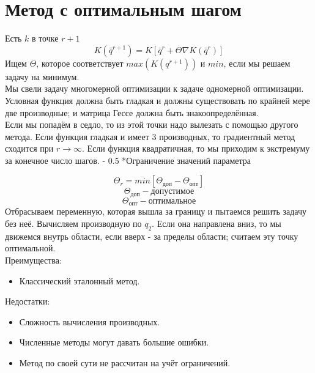 \documentclass[12pt,a5paper]{scrbook}
\makeatletter
\renewcommand\paragraph{\@startsection{paragraph}{4}{0mm}%
{-\baselineskip} %
{0.5\baselineskip} %
{\normalfont\bfseries}}%
\makeatother
\begin{document}
  \section{Метод с оптимальным шагом}
  Есть $k$ в точке $r+1$
  $$K(\bar{q}^{r+1}) = K[\bar{q}^r + \Theta\nabla K(\bar{q}^r)]$$
  Ищем $\Theta$, которое соответствует $max(K(q^{r+1}))$ и $min$, если мы решаем задачу на минимум.\\
  Мы свели задачу многомерной оптимизации к задаче одномерной оптимизации. Условная функция должна быть гладкая и должны существовать по крайней мере две производные; и матрица Гессе должна быть знакоопределённая.\\
  Если мы попадём в седло, то из этой точки надо вылезать с помощью другого метода. Если функция гладкая и имеет 3 производных, то градиентный метод сходится при $r \rightarrow \infty$. Если функция квадратичная, то мы приходим к экстремуму за конечное число шагов.
  \paragraph*{Ограничение значений параметра}
  $$\Theta_r = min[\Theta_{\text{доп}} - \Theta_{\text{опт}}]$$
  $$\Theta_{\text{доп}} - \text{допустимое}$$
  $$\Theta_{\text{опт}} - \text{оптимальное}$$
  Отбрасываем переменную, которая вышла за границу и пытаемся решить задачу без неё. Вычисляем производную по $q_2$. Если она направлена вниз, то мы движемся внутрь области, если вверх - за пределы области; считаем эту точку оптимальной.\\
  Преимущества: 
  \begin{itemize}
    \item Классический эталонный метод.
  \end{itemize}
  Недостатки: 
  \begin{itemize}
    \item Сложность вычисления производных.
    \item Численные методы могут давать большие ошибки.
    \item Метод по своей сути не рассчитан на учёт ограничений.
  \end{itemize}
\end{document}

